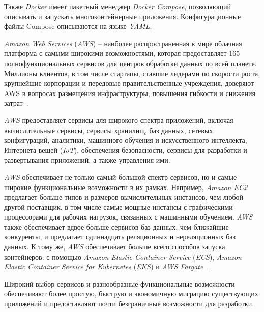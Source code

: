 Также \textit{Docker} имеет пакетный менеджер \textit{Docker Compose}, позволяющий описывать и запускать многоконтейнерные приложения. Конфигурационные файлы Compose описываются на языке \textit{YAML}.

\textit{Amazon Web Services} (\textit{AWS}) – наиболее распространенная в мире облачная платформа с самыми широкими возможностями, которая предоставляет 165 полнофункциональных сервисов для центров обработки данных по всей планете. Миллионы клиентов, в том числе стартапы, ставшие лидерами по скорости роста, крупнейшие корпорации и передовые правительственные учреждения, доверяют AWS в вопросах размещения инфраструктуры, повышения гибкости и снижения затрат~\cite{aws}.

\textit{AWS} предоставляет сервисы для широкого спектра приложений, включая вычислительные сервисы, сервисы хранилищ, баз данных, сетевых конфигураций, аналитики, машинного обучения и искусственного интеллекта, Интернета вещей (\textit{IoT}), обеспечения безопасности, сервисы для разработки и развертывания приложений, а также управления ими.

\textit{AWS} обеспечивает не только самый большой спектр сервисов, но и самые широкие функциональные возможности в их рамках. Например, \textit{Amazon EC2} предлагает больше типов и размеров вычислительных инстансов, чем любой другой поставщик, в том числе самые мощные инстансы с графическими процессорами для рабочих нагрузок, связанных с машинными обучением. \textit{AWS} также обеспечивает вдвое больше сервисов баз данных, чем ближайшие конкуренты, и предлагает одиннадцать реляционных и нереляционных баз данных. К тому же, \textit{AWS} обеспечивает больше всего способов запуска контейнеров: с помощью \textit{Amazon Elastic Container Service} (\textit{ECS}), \textit{Amazon Elastic Container Service for Kubernetes} (\textit{EKS}) и \textit{AWS Fargate}~\cite{aws}.

Широкий выбор сервисов и разнообразные функциональные возможности обеспечивают более простую, быструю и экономичную миграцию существующих приложений и предоставляют почти безграничные возможности для разработки.


